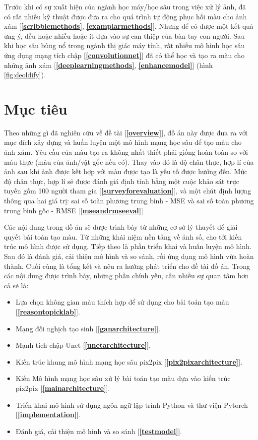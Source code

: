\documentclass[a4paper, 12pt]{report}
\begin{document}
Trước khi có sự xuất hiện của ngành học máy/học sâu \cite{wikiml2021, wikideeplearning2021} trong việc xử lý ảnh, đã có rất nhiều kỹ thuật được đưa ra cho quá trình tự động phục hồi màu cho ảnh xám [\textbf{\ref{scribblemethods}}, \textbf{\ref{examplarmethods}}].
Nhưng để có được một kết quả ưng ý, đều hoặc nhiều hoặc ít dựa vào sự can thiệp của bàn tay con người.
Sau khi học sâu bùng nổ trong ngành thị giác máy tính, rất nhiều mô hình học sâu ứng dụng mạng tích chập [\textbf{\ref{convolutionnet}}] đã có thể học và tạo ra màu cho những ảnh xám [\textbf{\ref{deeplearningmethods}}, \textbf{\ref{enhancemodel}}] (hình \ref{fig:deoldify}).

\section{Mục tiêu}\label{objective}

Theo những gì đã nghiên cứu về đề tài [\textbf{\ref{overview}}], đồ án này được đưa ra với mục đích xây dựng và huấn luyện một mô hình mạng học sâu để tạo màu cho ảnh xám.
Yêu cầu của màu tạo ra không nhất thiết phải giống hoàn toàn so với màu thực (màu của ảnh/vật gốc nếu có).
Thay vào đó là độ chân thực, hợp lí của ảnh sau khi ảnh được kết hợp với màu được tạo là yếu tố được hướng đến.
Mức độ chân thực, hợp lí sẽ được đánh giá định tính bằng một cuộc khảo sát trực tuyến gồm 100 người tham gia [\textbf{\ref{surveyforevaluation}}], và một chút định lượng thông qua hai giá trị: sai số toàn phương trung bình - MSE và sai số toàn phương trung bình gốc - RMSE [\textbf{\ref{mseandrmseeval}}]\vspace{5pt}

Các nội dung trong đồ án sẽ được trình bày từ những cơ sở lý thuyết để giải quyết bài toán tạo màu.
Từ những khái niệm nền tảng về ảnh số, cho tới kiến trúc mô hình được sử dụng.
Tiếp theo là phần triển khai và huấn luyện mô hình.
Sau đó là đánh giá, cải thiện mô hình và so sánh, rồi ứng dụng mô hình vừa hoàn thành.
Cuối cùng là tổng kết và nêu ra hướng phát triển cho đề tài đồ án.
Trong các nội dung được trình bày, những phần chính yếu, cần nhiều sự quan tâm hơn cả sẽ là:

\begin{itemize}
    \item Lựa chọn không gian màu thích hợp để sử dụng cho bài toán tạo màu [\textbf{\ref{reasontopicklab}}].
    \item Mạng đối nghịch tạo sinh [\textbf{\ref{ganarchitecture}}].
    \item Mạnh tích chập Unet [\textbf{\ref{unetarchitecture}}].
    \item Kiến trúc khung mô hình mạng học sâu pix2pix [\textbf{\ref{pix2pixarchitecture}}].
    \item Kiến Mô hình mạng học sâu xử lý bài toán tạo màu dựa vào kiến trúc pix2pix [\textbf{\ref{mainarchitecture}}].
    \item Triển khai mô hình sử dụng ngôn ngữ lập trình Python và thư viện Pytorch [\textbf{\ref{implementation}}].
    \item Đánh giá, cải thiện mô hình và so sánh [\textbf{\ref{testmodel}}].
\end{itemize}
\end{document}
